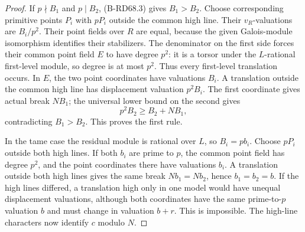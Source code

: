 \begin{proof}
If \(p\nmid B_1\) and \(p\mid B_2\), (B-RD68.3) gives \(B_1>B_2\).
Choose corresponding primitive points \(P_i\) with \(pP_i\)
outside the common high line. Their \(v_R\)-valuations are
\(B_i/p^2\). Their point fields over \(R\) are equal, because
the given Galois-module isomorphism identifies their stabilizers.
The denominator on the first side forces their common point
field \(E\) to have degree \(p^2\): it is a torsor under
the \(L\)-rational first-level module, so degree is at most \(p^2\).
Thus every first-level translation occurs.
In \(E\), the two point coordinates have valuations \(B_i\).
A translation outside the common high line has displacement
valuation \(p^2B_i\). The first coordinate gives actual break
\(NB_1\); the universal lower bound on the second gives
\[
 p^2B_2\ge B_2+NB_1,
 \tag{B-RD68.4}
\]
contradicting \(B_1>B_2\). This proves the first rule.

In the tame case the residual module is rational over \(L\),
so \(B_i=pb_i\). Choose \(pP_i\) outside both high lines.
If both \(b_i\) are prime to \(p\), the common point field has
degree \(p^2\), and the point coordinates there have valuations
\(b_i\). A translation outside both high lines gives the same
break \(Nb_1=Nb_2\), hence \(b_1=b_2=b\).
If the high lines differed, a translation high only in one
model would have unequal displacement valuations, although
both coordinates have the same prime-to-\(p\) valuation \(b\)
and must change in valuation \(b+r\). This is impossible.
The high-line characters now identify \(c\) modulo \(N\).
\end{proof}

